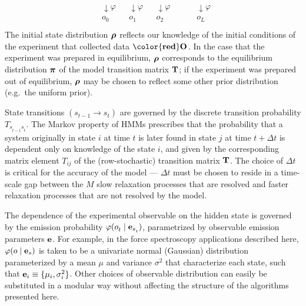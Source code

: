 \documentclass[aps,pre,twocolumn,superscriptaddress,nofootinbib,longbibliography]{revtex4-1}
\newcommand{\bfv}[1]{{\mbox{\boldmath{$#1$}}}}
\newcommand{\bfm}[1]{{\bf #1}}
\begin{document}
{\begin{eqnarray}
\begin{array}{llllllllll}
 & \downarrow \varphi &  & \downarrow \varphi & & \downarrow \varphi & & & & \downarrow \varphi \\
 & o^{}_{0} & & o^{}_{1} & & o^{}_{2} &  & & & o^{}_{L^{}} \\
\end{array}
\end{eqnarray} 
The initial state distribution $\bfv{\rho}^{}$  reflects our knowledge of the initial conditions of the experiment that collected data $\bfm{{\color{red} O}}^{}$.
In the case that the experiment was prepared in equilibrium, $\bfv{\rho}$ corresponds to the equilibrium distribution $\bfv{\pi}$ of the model transition matrix $\bfm{T}$; if the experiment was prepared out of equilibrium, $\bfv{\rho}$ may be chosen to reflect some other prior distribution (e.g.~the uniform prior).

State transitions $(s^{}_{t-1} \rightarrow s^{}_{t})$ are governed by the discrete transition probability $T_{s^{}_{t-1} s^{}_{t}}$.
The Markov property of HMMs prescribes that the probability that a system originally in state $i$ at time $t$ is later found in state $j$ at time $t+\Delta t$ is dependent only on knowledge of the state $i$, and given by the corresponding matrix element $T_{ij}$ of the (row-stochastic) transition matrix $\bfm{T}$.
{\color{magenta}The choice of $\Delta t$ is critical for the accuracy of the model \cite{NoeEtAl_PMMHMM_JCP13} --- $\Delta t$ must
be chosen to reside in a time-scale gap between the $M$ slow relaxation processes that are resolved and faster relaxation
processes that are not resolved by the model.}

{\color{magenta}The dependence of the experimental observable on the hidden state}
is governed by the emission probability $\varphi(o^{}_{t} \mid \bfm{e}_{s^{}_{t}})$, parametrized by observable emission parameters $\bfm{e}$.
For example, in the force spectroscopy applications described here, $\varphi(o \mid \bfm{e}_s)$ is taken to be a univariate normal (Gaussian) distribution parameterized by a mean $\mu$ and variance $\sigma^2$ that characterize each state, such that $\bfm{e}_i \equiv \{\mu_i, \sigma^2_i\}$.
Other choices of observable distribution can easily be substituted in a modular way without affecting the structure of the algorithms presented here.

}
\end{document}
